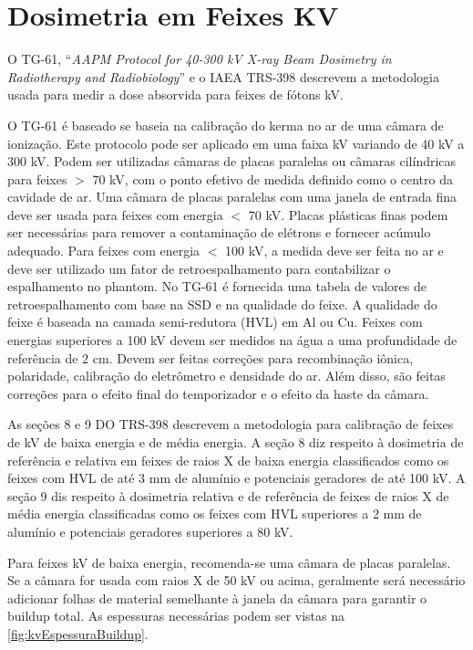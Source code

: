 \documentclass[11pt,a4paper]{article}
\begin{document}
\section{Dosimetria em Feixes KV}

	O TG-61, ``\textit{AAPM Protocol for 40-300 kV X-ray Beam Dosimetry in Radiotherapy and Radiobiology}'' e o IAEA TRS-398 descrevem a metodologia usada para medir a dose absorvida para feixes de fótons kV. 
	
	O  TG-61 é baseado se baseia na calibração do kerma no ar de uma câmara de ionização. Este protocolo pode ser aplicado em uma faixa kV variando de 40 kV a 300 kV. Podem ser utilizadas câmaras de placas paralelas ou câmaras cilíndricas para feixes $>$ 70 kV, com o ponto efetivo de medida definido como o centro da cavidade de ar. Uma câmara de placas paralelas com uma janela de entrada fina deve ser usada para feixes com energia  $<$ 70 kV. Placas plásticas finas podem ser necessárias para remover a contaminação de elétrons e fornecer acúmulo adequado. Para feixes com energia $<$ 100 kV, a medida deve ser feita no ar e deve ser utilizado um  fator de retroespalhamento  para contabilizar o espalhamento no phantom. No TG-61 é fornecida uma tabela de valores de retroespalhamento com base na SSD e na qualidade do feixe. A qualidade do feixe é baseada na camada semi-redutora (HVL) em Al ou Cu. Feixes com energias superiores a 100 kV devem ser medidos na água a uma profundidade de referência de 2 cm. Devem ser feitas correções para recombinação iônica, polaridade, calibração do eletrômetro e densidade do ar. Além disso, são feitas correções para o efeito final do temporizador e o efeito da haste da câmara.

	As seções 8 e 9 DO TRS-398 descrevem a metodologia para calibração de feixes de kV de baixa energia e de média energia. A seção 8 diz respeito à dosimetria de referência e relativa em feixes de raios X de baixa energia classificados como os feixes com HVL de até 3 mm de alumínio e potenciais geradores de até 100 kV.  A seção 9 dis respeito à dosimetria relativa e de referência de feixes de raios X de média energia classificadas como os feixes com HVL superiores a 2 mm de alumínio e potenciais geradores superiores a 80 kV.
	
	Para feixes kV de baixa energia, recomenda-se uma câmara de placas paralelas. Se a câmara for usada com raios X de 50 kV ou acima, geralmente será necessário adicionar folhas de material semelhante à janela da câmara para garantir o buildup total. As espessuras necessárias podem ser vistas na \ref{fig:kvEspessuraBuildup}.
\end{document}
